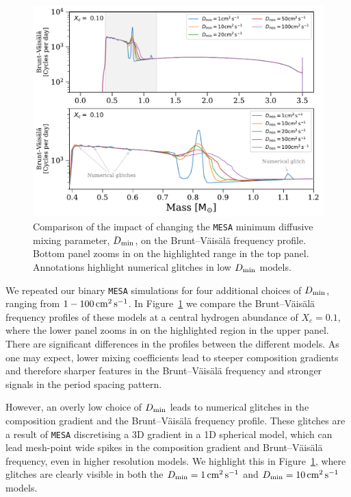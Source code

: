 \documentclass[desactivate]{aa}
\begin{document}
\begin{figure}[b]
    \centering
    \includegraphics[width=\columnwidth]{figures/min_D_mix_comparison.pdf}
    \caption{Comparison of the impact of changing the \texttt{MESA} minimum diffusive mixing parameter, $D_{\rm min}$, on the Brunt–Väisälä frequency profile. Bottom panel zooms in on the highlighted range in the top panel. Annotations highlight numerical glitches in low $D_{\rm min}$ models.}
    \label{fig:min_D_mix}
\end{figure}

We repeated our binary \texttt{MESA} simulations for four additional choices of $D_{\rm min}$, ranging from $1 - 100 \,{\rm cm^2 \, s^{-1}}$. In Figure~\ref{fig:min_D_mix} we compare the Brunt–Väisälä frequency profiles of these models at a central hydrogen abundance of $X_c = 0.1$, where the lower panel zooms in on the highlighted region in the upper panel. There are significant differences in the profiles between the different models. As one may expect, lower mixing coefficients lead to steeper composition gradients and therefore sharper features in the Brunt–Väisälä frequency and stronger signals in the period spacing pattern.

However, an overly low choice of $D_{\rm min}$ leads to numerical glitches in the composition gradient and the Brunt–Väisälä frequency profile. These glitches are a result of \texttt{MESA} discretising a 3D gradient in a 1D spherical model, which can lead mesh-point wide spikes in the composition gradient and Brunt–Väisälä frequency, even in higher resolution models. We highlight this in Figure~\ref{fig:min_D_mix}, where glitches are clearly visible in both the $D_{\rm min} = 1 \,{\rm cm^2 \, s^{-1}}$ and $D_{\rm min} = 10 \,{\rm cm^2 \, s^{-1}}$ models.
\end{document}
